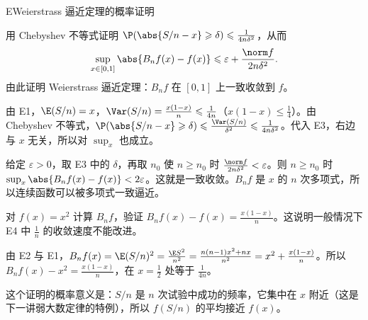 \begin{probleme}{E}{Weierstrass 逼近定理的概率证明}
\begin{questions}
\item 用 Chebyshev 不等式证明 $\P(\abs{S/n-x}\geqslant\delta)\leqslant\frac1{4n\delta^2}$，从而
\[
\sup_{x\in[0,1]}\abs{B_nf(x)-f(x)}\leqslant\varepsilon+\frac{\norm f}{2n\delta^2}.
\]
由此证明 Weierstrass 逼近定理：$B_nf$ 在 $[0,1]$ 上一致收敛到 $f$。
\begin{solution}
由 E1，$\E(S/n)=x$，$\Var(S/n)=\frac{x(1-x)}n\leqslant\frac1{4n}$（$x(1-x)\leqslant\frac14$）。由 Chebyshev 不等式，$\P(\abs{S/n-x}\geqslant\delta)\leqslant\frac{\Var(S/n)}{\delta^2}\leqslant\frac1{4n\delta^2}$。代入 E3，右边与 $x$ 无关，所以对 $\sup_x$ 也成立。

给定 $\varepsilon>0$，取 E3 中的 $\delta$，再取 $n_0$ 使 $n\geqslant n_0$ 时 $\frac{\norm f}{2n\delta^2}<\varepsilon$。则 $n\geqslant n_0$ 时 $\sup_x\abs{B_nf(x)-f(x)}<2\varepsilon$。这就是一致收敛。$B_nf$ 是 $x$ 的 $n$ 次多项式，所以连续函数可以被多项式一致逼近。
\end{solution}

\item 对 $f(x)=x^2$ 计算 $B_nf$，验证 $B_nf(x)-f(x)=\frac{x(1-x)}n$。这说明一般情况下 E4 中 $\frac1n$ 的收敛速度不能改进。
\begin{solution}
由 E2 与 E1，$B_nf(x)=\E(S/n)^2=\frac{\E S^2}{n^2}=\frac{n(n-1)x^2+nx}{n^2}=x^2+\frac{x(1-x)}n$。所以 $B_nf(x)-x^2=\frac{x(1-x)}n$，在 $x=\frac12$ 处等于 $\frac1{4n}$。

这个证明的概率意义是：$S/n$ 是 $n$ 次试验中成功的频率，它集中在 $x$ 附近（这是下一讲弱大数定律的特例），所以 $f(S/n)$ 的平均接近 $f(x)$。
\end{solution}
\end{questions}
\end{probleme}
